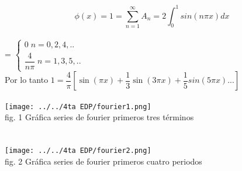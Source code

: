 \documentclass[10pt,a4paper]{report}
\begin{document}
$$\displaystyle \phi (x) = 1 = \sum_{n=1}^\infty A_n = 2 \int_0^1 sin(n \pi x) dx$$
\\ \large = $\displaystyle
\left \{ \begin{matrix}
0 \; n = 0,2,4,..
\\
\dfrac{4}{n \pi} \; n = 1,3,5,..
\end{matrix} \right. $
\\ Por lo tanto $1 = \dfrac{4}{\pi}\left[\sin(\pi x)+\dfrac{1}{3}\sin(3 \pi x)+\dfrac{1}{5}sin(5 \pi x)...\right]$
\\\\ \texttt{[image: ../../4ta EDP/fourier1.png]} 
\\fig. 1 Gráfica series de fourier primeros tres términos 
\\
\\\\ \texttt{[image: ../../4ta EDP/fourier2.png]}
\\fig. 2 Gráfica series de fourier primeros cuatro periodos
\end{document}
